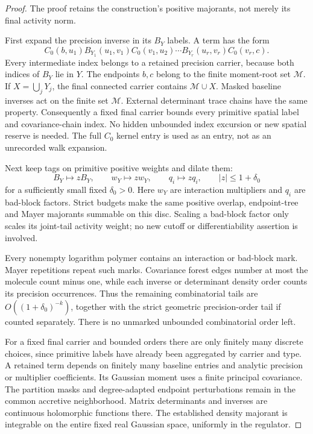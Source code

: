 \begin{proof}
The proof retains the construction's positive majorants, not
merely its final activity norm.

First expand the precision inverse in its \(B_Y\) labels.
A term has the form
\[
 C_0(b,u_1)B_{Y_1}(u_1,v_1)C_0(v_1,u_2)
       \cdots B_{Y_r}(u_r,v_r)C_0(v_r,c).
\]
Every intermediate index belongs to a retained precision
carrier, because both indices of \(B_Y\) lie in \(Y\).
The endpoints \(b,c\) belong to the finite moment-root set
\(\mathcal M\). If \(X=\bigcup_jY_j\), the final connected
carrier contains \(\mathcal M\cup X\). Masked baseline
inverses act on the finite set \(\mathcal M\). External
determinant trace chains have the same property. Consequently
a fixed final carrier bounds every primitive spatial label
and covariance-chain index. No hidden unbounded index excursion
or new spatial reserve is needed. The full \(C_0\) kernel entry
is used as an entry, not as an unrecorded walk expansion.

Next keep tags on primitive positive weights and dilate them:
\begin{equation}
 B_Y\mapsto zB_Y,\qquad
 w_Y\mapsto zw_Y,\qquad q_i\mapsto zq_i,
 \qquad |z|\le1+\delta_0
 \label{qll-mark-dilation}
\end{equation}
for a sufficiently small fixed \(\delta_0>0\).
Here \(w_Y\) are interaction multipliers and \(q_i\) are
bad-block factors. Strict budgets make the same positive
overlap, endpoint-tree and Mayer majorants summable on this
disc. Scaling a bad-block factor only scales its joint-tail
activity weight; no new cutoff or differentiability assertion
is involved.

Every nonempty logarithm polymer contains an interaction or
bad-block mark. Mayer repetitions repeat such marks. Covariance
forest edges number at most the molecule count minus one,
while each inverse or determinant density order counts its
precision occurrences. Thus the remaining combinatorial tails
are \(O((1+\delta_0)^{-k})\), together with the strict geometric
precision-order tail if counted separately. There is no
unmarked unbounded combinatorial order left.

For a fixed final carrier and bounded orders there are only
finitely many discrete choices, since primitive labels have
already been aggregated by carrier and type. A retained term
depends on finitely many baseline entries and analytic
precision or multiplier coefficients. Its Gaussian moment
uses a finite principal covariance. The partition masks and
degree-adapted endpoint perturbations remain in the common
accretive neighborhood. Matrix determinants and inverses are
continuous holomorphic functions there. The established
density majorant is integrable on the entire fixed real
Gaussian space, uniformly in the regulator.


\end{proof}
